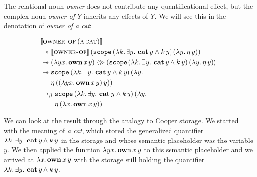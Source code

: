 The relational noun \emph{owner} does not contribute any quantificational
effect, but the complex noun \emph{owner of $Y$} inherits any effects of
$Y$. We will see this in the denotation of \emph{owner of a cat}:

\begin{align*}
&\llbracket \textsc{owner-of}\,(\textsc{a}\,\textsc{cat}) \rrbracket \\
&\twoheadrightarrow \llbracket \textsc{owner-of} \rrbracket\,(\mathtt{scope}\,(\lambda k.\, \exists y.\ \textbf{cat}\,y \land k\,y)\,(\lambda y.\, \eta\,y)) \\
&\twoheadrightarrow (\lambda y x.\, \textbf{own}\,x\,y) \mathbin{\cdot\!\!\gg} (\mathtt{scope}\,(\lambda k.\, \exists y.\ \textbf{cat}\,y \land k\,y)\,(\lambda y.\, \eta\,y)) \\
&\twoheadrightarrow \begin{aligned}[t]
    &\mathtt{scope}\,(\lambda k.\, \exists y.\ \textbf{cat}\,y \land k\,y)\,(\lambda y.\,  \\
    &\eta\,((\lambda y x.\, \textbf{own}\,x\,y)\,y))
  \end{aligned} \\
&\to_\beta \begin{aligned}[t]
    &\mathtt{scope}\,(\lambda k.\, \exists y.\ \textbf{cat}\,y \land k\,y)\,(\lambda y.\,  \\
    &\eta\,(\lambda x.\, \textbf{own}\,x\,y))
  \end{aligned}
\end{align*}

We can look at the result through the analogy to Cooper storage. We started
with the meaning of \emph{a cat}, which stored the generalized quantifier
$\lam{k}{\exists y.\ \ap{\obj{cat}}{y} \land \ap{k}{y}}$ in the storage and
whose semantic placeholder was the variable $y$. We then applied the
function $\lambda y x.\, \textbf{own}\,x\,y$ to this semantic placeholder
and we arrived at $\lambda x.\, \textbf{own}\,x\,y$ with the storage still
holding the quantifier
$\lam{k}{\exists y.\ \ap{\obj{cat}}{y} \land \ap{k}{y}}$.

